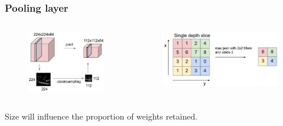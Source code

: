 \begin{frame}
        \frametitle{Pooling layer}

        \begin{columns}
                \begin{figure}
                        \includegraphics[width=1\textwidth]{Pics/pool}
                \end{figure}
                \begin{figure}
                        \includegraphics[width=1\textwidth]{Pics/maxpool}
                \end{figure}

        \end{columns}

	\vskip 0.5cm
	Size will influence the proportion of weights retained.

\end{frame}

